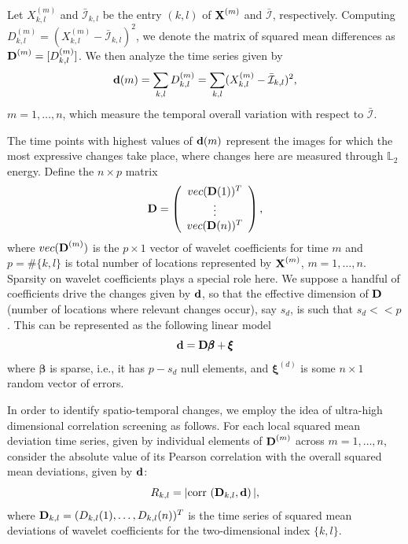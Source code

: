 \documentclass[journal]{IEEEtran}
\def\corr{\mbox{{\rm corr\,}}}
\newcommand{\vbeta}{\pmb{\beta}}
\newcommand{\vxi}{\pmb{\xi}}
\newcommand{\vD}{{\textbf D}}
\newcommand{\vd}{{\textbf d}}
\newcommand{\vX}{{\textbf X}}
\begin{document}
Let $X_{k,l}^{(m)}$ and $\bar{\mathcal{I}}_{k,l}$ be the entry $(k,l)$ of $\vX^{(m)}$ and $\bar{\mathcal{I}}$, respectively. Computing $D_{k,l}^{(m)}=(X_{k,l}^{(m)}-\bar{\mathcal{I}}_{k,l})^2$, we denote the matrix of squared mean differences as $\vD^{(m)} = [D_{k,l}^{(m)}]$. We then 
analyze the time series given by
\begin{equation} 
\vd(m)= \sum_{k,l}D_{k,l}^{(m)} = \sum_{k,l}(X_{k,l}^{(m)} - \bar{\mathcal{I}}_{k,l})^2,
\label{E:eq_defdm}
\end{equation}
$m=1,\ldots,n$, which measure the temporal overall variation with respect to $\bar{\mathcal{I}}$.

The time points with highest values of $\vd(m)$ represent the images for which the most expressive changes take place, where changes here are measured through $\mathbb{L}_2$ energy. Define the  $n\times p$ matrix
\begin{equation*}
 \vD=\left(
 \begin{array}{c}
 vec(\vD(1))^T\\
 \vdots\\
 vec(\vD(n))^T\\
 \end{array}
 \right),
\label{eq_defmatrixD}
\end{equation*}
where $vec(\vD^{(m)})$ is the $p\times 1$ vector of wavelet coefficients for time $m$ and $p=\#\{k,l\}$ is total number of locations represented by $\vX^{(m)}$, $m=1,\ldots,n$. Sparsity \cite{johnstone2009statistical} on wavelet coefficients plays a special role here.  We suppose a handful of coefficients drive the changes given by $\vd$, so that the effective dimension of $\vD$ (number of locations where relevant changes occur), say $s_d$, is such that $s_d<<p$. This can be represented as the following linear model
\begin{equation} 
\vd=\vD\vbeta+\vxi
\label{E:sparsemodel_d}
\end{equation}
where $\vbeta$ is sparse, i.e., it has $p-s_d$ null elements, and $\vxi^{(d)}$ is some $n\times 1$ random vector of errors.

In order to identify spatio-temporal changes, we employ the idea of ultra-high dimensional correlation screening \cite{fan2020statistical} as follows. For each local squared mean deviation time series, given by individual elements of $\vD^{(m)}$ across $m=1,\ldots,n$, consider the absolute value of its Pearson correlation with the overall squared mean deviations, given by $\vd$:
\begin{equation*}
R_{k,l}= |\corr\left( \vD_{k,l}, \vd\right)|,
\label{def_Rkld}
\end{equation*}
where $\vD_{k,l}=(D_{k,l}(1),\ldots,D_{k,l}(n))^T$ is the time series of squared mean deviations of wavelet coefficients for the two-dimensional index $\{k,l\}$.
\end{document}
